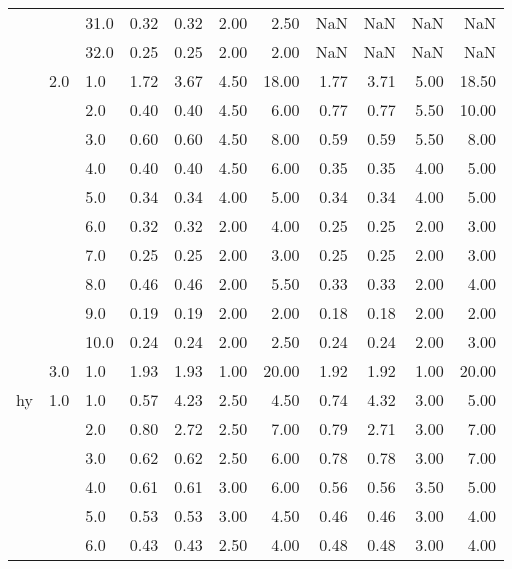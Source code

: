 \begin{tabular}{lllrrrrrrrr}
   &     & 31.0 &       0.32 &      0.32 & 2.00 &   2.50 &        NaN &       NaN &  NaN &    NaN \\
   &     & 32.0 &       0.25 &      0.25 & 2.00 &   2.00 &        NaN &       NaN &  NaN &    NaN \\
   & 2.0 & 1.0  &       1.72 &      3.67 & 4.50 &  18.00 &       1.77 &      3.71 & 5.00 &  18.50 \\
   &     & 2.0  &       0.40 &      0.40 & 4.50 &   6.00 &       0.77 &      0.77 & 5.50 &  10.00 \\
   &     & 3.0  &       0.60 &      0.60 & 4.50 &   8.00 &       0.59 &      0.59 & 5.50 &   8.00 \\
   &     & 4.0  &       0.40 &      0.40 & 4.50 &   6.00 &       0.35 &      0.35 & 4.00 &   5.00 \\
   &     & 5.0  &       0.34 &      0.34 & 4.00 &   5.00 &       0.34 &      0.34 & 4.00 &   5.00 \\
   &     & 6.0  &       0.32 &      0.32 & 2.00 &   4.00 &       0.25 &      0.25 & 2.00 &   3.00 \\
   &     & 7.0  &       0.25 &      0.25 & 2.00 &   3.00 &       0.25 &      0.25 & 2.00 &   3.00 \\
   &     & 8.0  &       0.46 &      0.46 & 2.00 &   5.50 &       0.33 &      0.33 & 2.00 &   4.00 \\
   &     & 9.0  &       0.19 &      0.19 & 2.00 &   2.00 &       0.18 &      0.18 & 2.00 &   2.00 \\
   &     & 10.0 &       0.24 &      0.24 & 2.00 &   2.50 &       0.24 &      0.24 & 2.00 &   3.00 \\
   & 3.0 & 1.0  &       1.93 &      1.93 & 1.00 &  20.00 &       1.92 &      1.92 & 1.00 &  20.00 \\
hy & 1.0 & 1.0  &       0.57 &      4.23 & 2.50 &   4.50 &       0.74 &      4.32 & 3.00 &   5.00 \\
   &     & 2.0  &       0.80 &      2.72 & 2.50 &   7.00 &       0.79 &      2.71 & 3.00 &   7.00 \\
   &     & 3.0  &       0.62 &      0.62 & 2.50 &   6.00 &       0.78 &      0.78 & 3.00 &   7.00 \\
   &     & 4.0  &       0.61 &      0.61 & 3.00 &   6.00 &       0.56 &      0.56 & 3.50 &   5.00 \\
   &     & 5.0  &       0.53 &      0.53 & 3.00 &   4.50 &       0.46 &      0.46 & 3.00 &   4.00 \\
   &     & 6.0  &       0.43 &      0.43 & 2.50 &   4.00 &       0.48 &      0.48 & 3.00 &   4.00 \\

\end{tabular}
